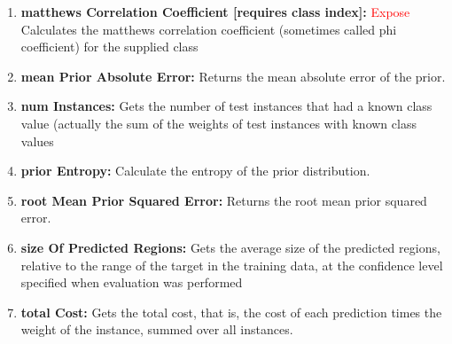 \documentclass[a4paper,12pt, english]{article}
\begin{document}
\begin{enumerate}
          
          



          
\item \textbf{matthews Correlation Coefficient [requires class index]: } \textcolor{red}{Expose}
          Calculates the matthews correlation coefficient (sometimes called phi coefficient) for the supplied class
          

          
\item \textbf{mean Prior Absolute Error: }
          Returns the mean absolute error of the prior.
          


\item \textbf{num Instances: }
          Gets the number of test instances that had a known class value (actually the sum of the weights of test instances with known class values

      
      



\item \textbf{prior Entropy: }
          Calculate the entropy of the prior distribution.    
                    
\item \textbf{root Mean Prior Squared Error: }
          Returns the root mean prior squared error.          
          
          
             
\item \textbf{size Of Predicted Regions: }
          Gets the average size of the predicted regions, relative to the range of the target in the training data, at the confidence level specified when evaluation was performed

\item \textbf{total Cost: }
          Gets the total cost, that is, the cost of each prediction times the weight of the instance, summed over all instances.                   


\end{enumerate}
\end{document}
